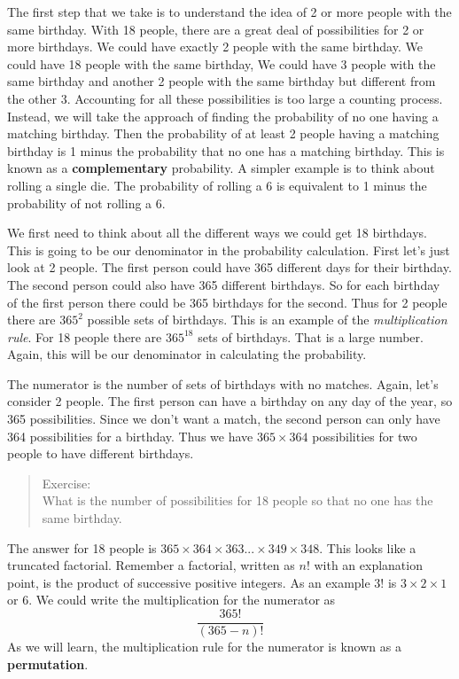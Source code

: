 \documentclass[
]{book}
\begin{document}
The first step that we take is to understand the idea of 2 or more people with the same birthday. With 18 people, there are a great deal of possibilities for 2 or more birthdays. We could have exactly 2 people with the same birthday. We could have 18 people with the same birthday, We could have 3 people with the same birthday and another 2 people with the same birthday but different from the other 3. Accounting for all these possibilities is too large a counting process. Instead, we will take the approach of finding the probability of no one having a matching birthday. Then the probability of at least 2 people having a matching birthday is 1 minus the probability that no one has a matching birthday. This is known as a \textbf{complementary} probability. A simpler example is to think about rolling a single die. The probability of rolling a 6 is equivalent to 1 minus the probability of not rolling a 6.

We first need to think about all the different ways we could get 18 birthdays. This is going to be our denominator in the probability calculation. First let's just look at 2 people. The first person could have 365 different days for their birthday. The second person could also have 365 different birthdays. So for each birthday of the first person there could be 365 birthdays for the second. Thus for 2 people there are \(365^2\) possible sets of birthdays. This is an example of the \emph{multiplication rule}. For 18 people there are \(365^{18}\) sets of birthdays. That is a large number. Again, this will be our denominator in calculating the probability.

The numerator is the number of sets of birthdays with no matches. Again, let's consider 2 people. The first person can have a birthday on any day of the year, so 365 possibilities. Since we don't want a match, the second person can only have 364 possibilities for a birthday. Thus we have \(365 \times 364\) possibilities for two people to have different birthdays.

\begin{quote}
Exercise:\\
What is the number of possibilities for 18 people so that no one has the same birthday.
\end{quote}

The answer for 18 people is \(365 \times 364 \times 363 ... \times 349 \times 348\). This looks like a truncated factorial. Remember a factorial, written as \(n!\) with an explanation point, is the product of successive positive integers. As an example \(3!\) is \(3 \times 2 \times 1\) or 6. We could write the multiplication for the numerator as \[\frac{365!}{(365-n)!}\] As we will learn, the multiplication rule for the numerator is known as a \textbf{permutation}.
\end{document}
